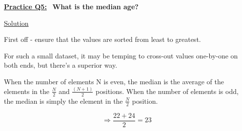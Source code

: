 \underline{\textbf{Practice Q5:}} \ \textbf{What is the median age?}

\bigskip

\underline{Solution}

First off - ensure that the values are sorted from least to greatest.

For such a small dataset, it may be temping to cross-out values one-by-one on
both ends, but there's a superior way.

When the number of elements N is even, the median is the average of the elements
in the $\frac{N}{2}$ and $\frac{(N+1)}{2}$ positions. When the number of
elements is odd, the median is simply the element in the $\frac{N}{2}$
position.

\[
    \Rightarrow \frac{22+24}{2} = \boxed{23}
\]